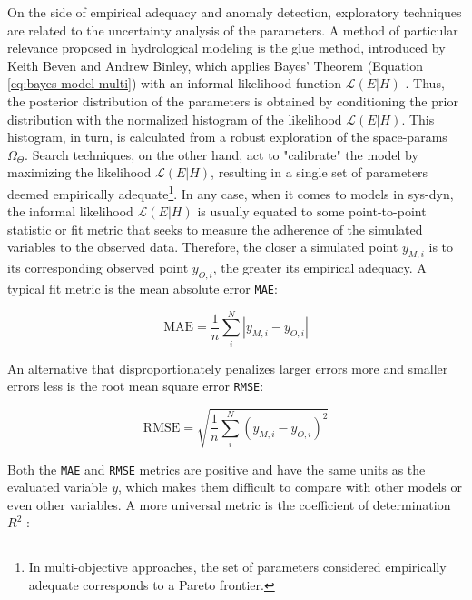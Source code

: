 \documentclass[./main_en.tex]{subfiles}
\begin{document}
\par On the side of empirical adequacy and anomaly detection, exploratory techniques are related to the uncertainty analysis of the \gls{parameters}. A method of particular relevance proposed in hydrological modeling is the \acrfull{glue} method, introduced by Keith Beven and Andrew Binley, which applies Bayes' Theorem (Equation \eqref{eq:bayes-model-multi}) with an informal likelihood function $\mathcal{L}(E|H)$ \cite{beven1992}. Thus, the posterior distribution of the \gls{parameters} is obtained by conditioning the prior distribution with the normalized histogram of the likelihood $\mathcal{L}(E|H)$. This histogram, in turn, is calculated from a robust exploration of the \gls{space-params} $\Omega_{\Theta}$. Search techniques, on the other hand, act to "calibrate" the \gls{model} by maximizing the likelihood $\mathcal{L}(E|H)$, resulting in a single set of \gls{parameters} deemed empirically adequate\footnote{In multi-objective approaches, the set of \gls{parameters} considered empirically adequate corresponds to a Pareto frontier.}. In any case, when it comes to models in \gls{sys-dyn}, the informal likelihood $\mathcal{L}(E|H)$ is usually equated to some point-to-point statistic or fit metric that seeks to measure the adherence of the simulated variables to the observed data. Therefore, the closer a simulated point $y_{M, i}$ is to its corresponding observed point $y_{O, i}$, the greater its empirical adequacy. A typical fit metric is the mean absolute error \texttt{MAE}:
\begin{linenomath*}
\begin{equation} 
	\label{eq:mae}
 \text{MAE} = \frac{1}{n}\sum_{i}^{N} |y_{M, i} - y_{O, i}| 
\end{equation}
\end{linenomath*}
An alternative that disproportionately penalizes larger errors more and smaller errors less is the root mean square error \texttt{RMSE}:
\begin{linenomath*}
\begin{equation} 
	\label{eq:rmse}
 \text{RMSE} = \sqrt{\frac{1}{n}\sum_{i}^{N} (y_{M, i} - y_{O, i})^2}  
\end{equation}
\end{linenomath*}
\par Both the \texttt{MAE} and \texttt{RMSE} metrics are positive and have the same units as the evaluated variable $y$, which makes them difficult to compare with other models or even other variables. A more universal metric is the coefficient of determination $R^2$ \cite{glantz2001}: 
\end{document}
